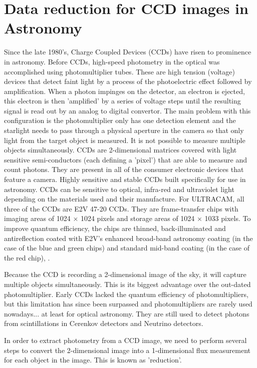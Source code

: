 \section{Data reduction for CCD images in Astronomy}
Since the late 1980's, Charge Coupled Devices (CCDs) have risen to prominence in astronomy. Before CCDs, high-speed photometry in the optical was accomplished using photomultiplier tubes. These are high tension (voltage) devices that detect faint light by a process of the photoelectric effect followed by amplification. When a photon impinges on the detector, an electron is ejected, this electron is then 'amplified' by a series of voltage steps until the resulting signal is read out by an analog to digital convertor. The main problem with this configuration is the photomultiplier only has one detection element and the starlight needs to pass through a physical aperture in the camera so that only light from the target object is measured. It is not possible to measure multiple objects simultaneously. CCDs are 2-dimensional matrices covered with light sensitive semi-conductors (each defining a 'pixel') that are able to measure and count photons. They are present in all of the consumer electronic devices that feature a camera. Highly sensitive and stable CCDs built specifically for use in astronomy. CCDs can be sensitive to optical, infra-red and ultraviolet light depending on the materials used and their manufacture. For ULTRACAM, all three of the CCDs are E2V 47-20 CCDs. They are frame-transfer chips with imaging areas of 1024 × 1024 pixels and storage areas of 1024 × 1033 pixels.  To improve quantum efficiency, the chips are thinned, back-illuminated and antireflection coated with E2V's enhanced broad-band astronomy coating (in the case of the blue and green chips) and standard mid-band coating (in the case of the red chip), \cite{dhillon07}.

Because the CCD is recording a 2-dimensional image of the sky, it will capture multiple objects simultaneously. This is its biggest advantage over the out-dated photomultiplier. Early CCDs lacked the quantum efficiency of photomultipliers, but this limitation has since been surpassed and photomultipliers are rarely used nowadays... at least for optical astronomy. They are still used to detect photons from scintillations in Cerenkov detectors and Neutrino detectors.  

In order to extract photometry from a CCD image, we need to perform several steps to convert the 2-dimensional image into a 1-dimensional flux measurement for each object in the image. This is known as 'reduction'. 

